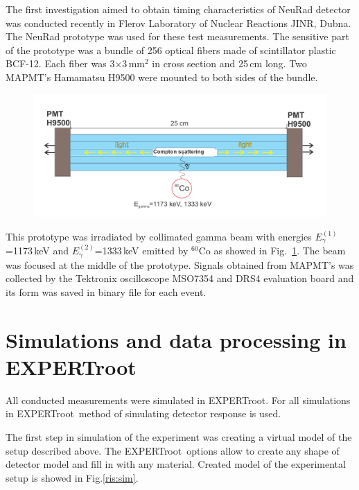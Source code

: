 \documentclass{webofc}
\newcommand{\er}{\textmd{EXPERTroot}}
\begin{document}
The first investigation aimed to obtain timing characteristics of NeuRad detector was conducted recently in Flerov Laboratory of Nuclear Reactions JINR, Dubna. The NeuRad prototype was used for these test measurements. The sensitive part of the prototype was a bundle of 256 optical fibers made of scintillator plastic BCF-12. Each fiber was  3$\times$3\,mm$^2$ in cross section and 25\,cm long.
Two MAPMT's Hamamatsu H9500 were mounted to both sides of the bundle.


\begin{figure}[h]
	\centering
	\includegraphics[width=1\linewidth]{NeuRadexperiment.png}
	\label{ris:neuradexp}
\end{figure}

This prototype was irradiated by collimated gamma beam with energies $E^{(1)}_{\gamma}$=1173\,keV and $E^{(2)}_{\gamma}$=1333\,keV emitted by $^{60}$Co as showed in Fig.~\ref{ris:neuradexp}. The beam was focused at the middle of the prototype. Signals obtained from MAPMT's was collected by the Tektronix oscilloscope MSO7354 and DRS4 evaluation board and its form was saved in binary file for each event.

\section{Simulations and data processing in EXPERTroot}
All conducted measurements were simulated in \er. For all simulations in \er\, method of simulating detector response \cite{er} is used.

The first step in simulation of the experiment was creating a virtual model of the setup described above.
The \er\, options allow to create any shape of detector model and fill in with any material. Created model of the experimental setup is showed in Fig.\ref{ris:sim}. 
\end{document}
